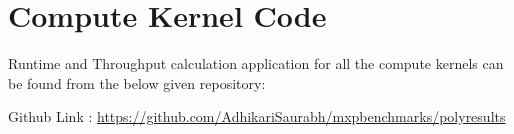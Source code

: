   \section{Compute Kernel Code}
  
  Runtime and Throughput calculation application for all the compute kernels can be found from the below given repository:
  
  Github Link : \url{https://github.com/AdhikariSaurabh/mxpbenchmarks/polyresults}
  
  
  
  
   
%  
% 
%    
%
%
    
    
    

